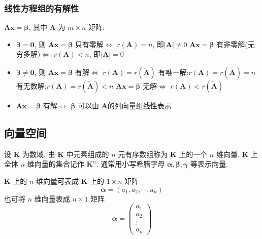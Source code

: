 \documentclass{article}
\begin{document}
			\subsubsection{线性方程组的有解性}
				$\boldsymbol{A}\boldsymbol{x}=\boldsymbol{\beta}$, 其中 $\boldsymbol{A}$ 为 $m \times n$ 矩阵:
				\begin{itemize}
					\item $\boldsymbol{\beta} = \mathbf{0}$, 则
						\subitem $\boldsymbol{A} \boldsymbol{x}=\boldsymbol{\beta}$ 只有零解$\Leftrightarrow$ $r(\boldsymbol{A})=n$, 即$\left| \boldsymbol{A} \right| \neq 0$
						\subitem $\boldsymbol{A} \boldsymbol{x}=\boldsymbol{\beta}$ 有非零解(无穷多解)$\Leftrightarrow$ $r(\boldsymbol{A})<n$, 即$\left| \boldsymbol{A} \right| = 0$
					\item $\boldsymbol{\beta} \neq \mathbf{0}$, 则
						\subitem $\boldsymbol{A} \boldsymbol{x}=\boldsymbol{\beta}$ 有解$\Leftrightarrow$ $r(\boldsymbol{A})=r(\boldsymbol{\tilde A})$
							\subsubitem 有唯一解:$r(\boldsymbol{A})=r(\boldsymbol{\tilde A})=n$
							\subsubitem 有无数解:$r(\boldsymbol{A})=r(\boldsymbol{\tilde A})<n$
						\subitem $\boldsymbol{A} \boldsymbol{x}=\boldsymbol{\beta}$ 无解$\Leftrightarrow$ $r(\boldsymbol{A})<r(\boldsymbol{\tilde A})$
					\item $\boldsymbol{A} \boldsymbol{x}=\boldsymbol{\beta}$ 有解$\Leftrightarrow$ $\boldsymbol{\beta}$ 可以由 $\boldsymbol{A}$的列向量组线性表示
				\end{itemize}
		\subsection{向量空间}
			设 $\mathbf{K}$ 为数域, 由 $\mathbf{K}$ 中元素组成的 $n$ 元有序数组称为 $\mathbf{K}$ 上的一个 $n$ 维向量. $\mathbf{K}$ 上全体 $n$ 维向量的集合记作 $\mathbf{K}^{n}$. 通常用小写希腊字母 $\boldsymbol{\alpha}, \boldsymbol{\beta}, \boldsymbol{\gamma}$ 等表示向量.

			$\mathbf{K}$ 上的 $n$ 维向量可表成 $\mathbf{K}$ 上的 $1 \times n$ 矩阵
			$$
			\boldsymbol{\alpha}=\left(a_{1}, a_{2}, \cdots, a_{n}\right)
			$$
			也可将 $n$ 维向量表成 $n \times 1$ 矩阵
			$$
			\boldsymbol{\alpha}=\left(\begin{array}{c}
				a_{1} \\
				a_{2} \\
				\vdots \\
				a_{n}
			\end{array}\right)
			$$
\end{document}
